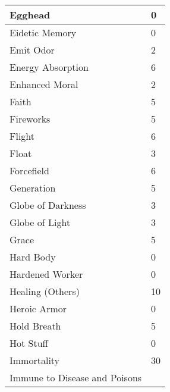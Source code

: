 \documentclass[twoside]{book}
\begin{document}
\begin{longtable}{p{1.25in}l}
  \raggedright
           Egghead 
  &
   0 
  \tabularnewline
  \hline
      
  \raggedright
           Eidetic Memory 
  &
   0 
  \tabularnewline
  \hline
      
  \raggedright
           Emit Odor 
  &
   2 
  \tabularnewline
  \hline
      
  \raggedright
           Energy Absorption 
  &
   6 
  \tabularnewline
  \hline
      
  \raggedright
           Enhanced Moral 
  &
   2 
  \tabularnewline
  \hline
      
  \raggedright
           Faith 
  &
   5 
  \tabularnewline
  \hline
      
  \raggedright
           Fireworks 
  &
   5 
  \tabularnewline
  \hline
      
  \raggedright
           Flight 
  &
   6 
  \tabularnewline
  \hline
      
  \raggedright
           Float 
  &
   3 
  \tabularnewline
  \hline
      
  \raggedright
           Forcefield 
  &
   6 
  \tabularnewline
  \hline
      
  \raggedright
           Generation 
  &
   5 
  \tabularnewline
  \hline
      
  \raggedright
           Globe of Darkness 
  &
   3 
  \tabularnewline
  \hline
      
  \raggedright
           Globe of Light 
  &
   3 
  \tabularnewline
  \hline
      
  \raggedright
           Grace 
  &
   5 
  \tabularnewline
  \hline
      
  \raggedright
           Hard Body 
  &
   0 
  \tabularnewline
  \hline
      
  \raggedright
           Hardened Worker 
  &
   0 
  \tabularnewline
  \hline
      
  \raggedright
           Healing (Others) 
  &
   10 
  \tabularnewline
  \hline
      
  \raggedright
           Heroic Armor 
  &
   0 
  \tabularnewline
  \hline
      
  \raggedright
           Hold Breath 
  &
   5 
  \tabularnewline
  \hline
      
  \raggedright
           Hot Stuff 
  &
   0 
  \tabularnewline
  \hline
      
  \raggedright
           Immortality 
  &
   30 
  \tabularnewline
  \hline
      
  \raggedright
           Immune to Disease and Poisons
           

\end{longtable}
\end{document}
